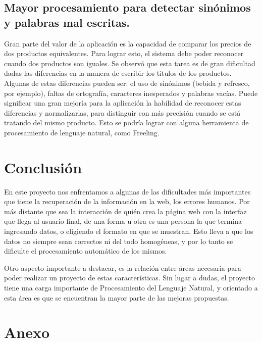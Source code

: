 \documentclass[12pt]{article} %
\begin{document}

\subsection{Mayor procesamiento para detectar sinónimos y palabras mal escritas.}
Gran parte del valor de la aplicación es la capacidad de comparar los precios de dos productos equivalentes. Para lograr esto, el sistema debe poder reconocer cuando dos productos son iguales. Se observó que esta tarea es de gran dificultad dadas las diferencias en la manera de escribir los títulos de los productos. Algunas de estas diferencias pueden ser: el uso de sinónimos (bebida y refresco, por ejemplo), faltas de ortografía, caracteres inesperados y palabras vacías. Puede significar una gran mejoría para la aplicación la habilidad de reconocer estas diferencias y normalizarlas, para distinguir con más precisión cuando se está tratando del mismo producto. Esto se podría lograr con alguna herramienta de procesamiento de lenguaje natural, como Freeling.



\section{Conclusión}

En este proyecto nos enfrentamos a algunas de las dificultades más importantes que tiene la recuperación de la información en la web, los errores humanos. Por más distante que sea la interacción de quién crea la página web con la interfaz que llega al usuario final, de una forma u otra es una persona la que termina ingresando datos, o eligiendo el formato en que se muestran. Esto lleva a que los datos no siempre sean correctos ni del todo homogéneas, y por lo tanto se dificulte el procesamiento automático de los mismos.

Otro aspecto importante a destacar, es la relación entre áreas necesaria para poder realizar un proyecto de estas características. Sin lugar a dudas, el proyecto tiene una carga importante de Procesamiento del Lenguaje Natural, y orientado a esta área es que se encuentran la mayor parte de las mejoras propuestas.

\section{Anexo}
\end{document}
